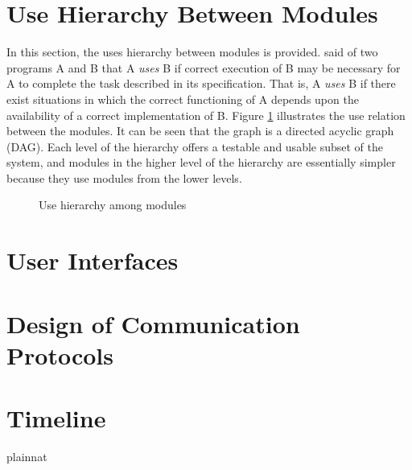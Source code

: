 \documentclass[12pt, titlepage]{article}
\begin{document}
\section{Use Hierarchy Between Modules} \label{SecUse}

In this section, the uses hierarchy between modules is
provided. \citet{Parnas1978} said of two programs A and B that A {\em uses} B if
correct execution of B may be necessary for A to complete the task described in
its specification. That is, A {\em uses} B if there exist situations in which
the correct functioning of A depends upon the availability of a correct
implementation of B.  Figure \ref{FigUH} illustrates the use relation between
the modules. It can be seen that the graph is a directed acyclic graph
(DAG). Each level of the hierarchy offers a testable and usable subset of the
system, and modules in the higher level of the hierarchy are essentially simpler
because they use modules from the lower levels.



\begin{figure}[H]
\centering
\caption{Use hierarchy among modules}
\label{FigUH}
\end{figure}


\section{User Interfaces}


\section{Design of Communication Protocols}


\section{Timeline}



 {plainnat}


\newpage{}
\end{document}
